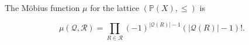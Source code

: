 The Möbius function $\mu$ for the lattice $(\mathbb{P}(X), \leq)$ is

$$\mu(\mathcal{Q}, \mathcal{R}) = \prod_{R \in \mathcal{R}} (-1)^{|\mathcal{Q}(R)|-1}(|\mathcal{Q}(R)|-1)!.$$
